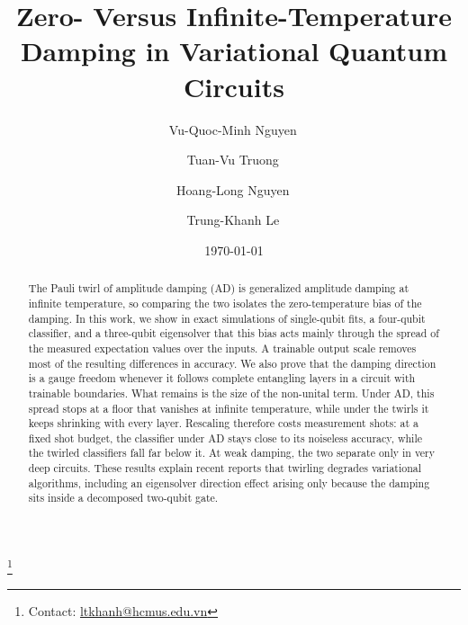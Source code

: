 \documentclass[
 aps,pra,
 twocolumn,
 superscriptaddress,
 longbibliography,
 nofootinbib
]{revtex4-2}
\makeatletter
\newcommand{\authornote}{Contact:
\href{mailto:ltkhanh@hcmus.edu.vn}{ltkhanh@hcmus.edu.vn}}
\makeatother
\begin{document}
\title{Zero- Versus Infinite-Temperature Damping in Variational Quantum Circuits}

\author{Vu-Quoc-Minh Nguyen\,}

\author{Tuan-Vu Truong\,}

\author{Hoang-Long Nguyen\,}

\author{Trung-Khanh Le\,}
\thanks{\authornote}

\date{\today}

\begin{abstract}
The Pauli twirl of amplitude damping (AD) is generalized amplitude damping at
infinite temperature, so comparing the two isolates the zero-temperature bias of
the damping. In this work, we show in exact simulations of
single-qubit fits, a four-qubit classifier, and a three-qubit eigensolver that
this bias acts mainly through the spread of the measured expectation values
over the inputs. A trainable output
scale removes most of the resulting differences in accuracy. We
also prove that the damping direction is a gauge freedom whenever it follows
complete entangling layers in a circuit with trainable
boundaries. What remains is the size of the non-unital term.
Under AD, this spread stops at a floor that vanishes at infinite
temperature, while under the twirls it keeps shrinking with every
layer. Rescaling therefore costs measurement shots: at a fixed shot budget, the
classifier under AD stays close to its noiseless accuracy, while the twirled
classifiers fall far below it. At weak damping, the two separate only in very deep
circuits. These results explain recent reports that twirling
degrades variational algorithms, including an eigensolver direction effect
arising only because the damping sits inside a decomposed two-qubit
gate.
\end{abstract}
\end{document}
